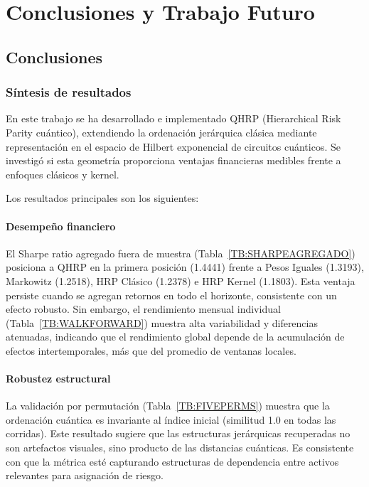 \chapter{Conclusiones y Trabajo Futuro}
\label{cap:conclusiones}

\section{Conclusiones}
\label{sec:conclusiones}

\subsection{Síntesis de resultados}
En este trabajo se ha desarrollado e implementado QHRP (Hierarchical Risk Parity cuántico), extendiendo la ordenación jerárquica clásica mediante representación en el espacio de Hilbert exponencial de circuitos cuánticos. Se investigó si esta geometría proporciona ventajas financieras medibles frente a enfoques clásicos y kernel.

Los resultados principales son los siguientes:

\subsubsection{Desempeño financiero}
El Sharpe ratio agregado fuera de muestra (Tabla~\ref{TB:SHARPEAGREGADO}) posiciona a QHRP en la primera posición (1.4441) frente a Pesos Iguales (1.3193), Markowitz (1.2518), HRP Clásico (1.2378) e HRP Kernel (1.1803). Esta ventaja persiste cuando se agregan retornos en todo el horizonte, consistente con un efecto robusto. Sin embargo, el rendimiento mensual individual (Tabla~\ref{TB:WALKFORWARD}) muestra alta variabilidad y diferencias atenuadas, indicando que el rendimiento global depende de la acumulación de efectos intertemporales, más que del promedio de ventanas locales.

\subsubsection{Robustez estructural}
La validación por permutación (Tabla~\ref{TB:FIVEPERMS}) muestra que la ordenación cuántica es invariante al índice inicial (similitud 1.0 en todas las corridas). Este resultado sugiere que las estructuras jerárquicas recuperadas no son artefactos visuales, sino producto de las distancias cuánticas. Es consistente con que la métrica esté capturando estructuras de dependencia entre activos relevantes para asignación de riesgo.

